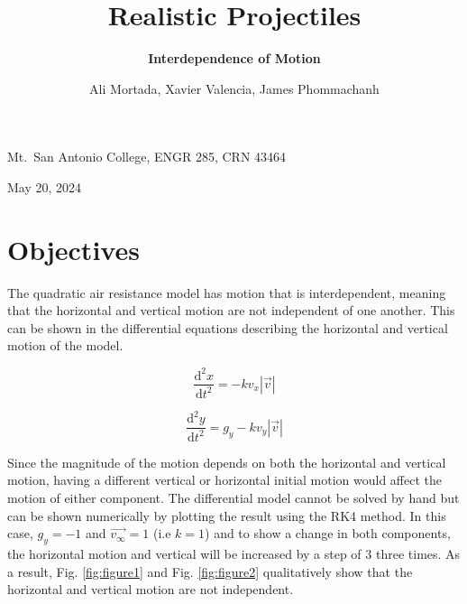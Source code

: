 \documentclass[12pt]{iopart} %
\begin{document}
\title{Realistic Projectiles}
\author{Ali Mortada, Xavier Valencia, James Phommachanh}
\vspace{10pt}
\begin{indented}
  \item[]Mt.~San Antonio College, ENGR 285, CRN 43464
  \item[]May 20, 2024
\end{indented}
\newpage

\section{Objectives}

\begin{center}
\subtitle{\textbf{Interdependence of Motion}}
\end{center}

The quadratic air resistance model has motion that is interdependent, meaning that the horizontal and vertical motion are not independent of one another. 
This can be shown in the differential equations describing the horizontal and vertical motion of the model. 

\begin{equation} \label{eq:1}
    \frac{\mathrm{d}^2 x}{\mathrm{d}t^2} = -k v_x |\vec{v}|
\end{equation}

\begin{equation} \label{eq:2}
  \frac{\mathrm{d}^2 y}{\mathrm{d}t^2} = g_y -k v_y |\vec{v}|
\end{equation}


Since the magnitude of the motion depends on both the horizontal and vertical motion, having a different vertical or horizontal initial motion would affect the motion of either component. 
The differential model cannot be solved by hand but can be shown numerically by plotting the result using the RK4 method. 
In this case, $g_y = -1$ and $\vec{v_\infty} = 1$ (i.e $k = 1$) and to show a change in both components, the horizontal motion and vertical will be increased by a step of 3 three times. 
As a result, Fig. \ref{fig:figure1} and Fig. \ref{fig:figure2} qualitatively show that the horizontal and vertical motion are not independent. 
\end{document}
